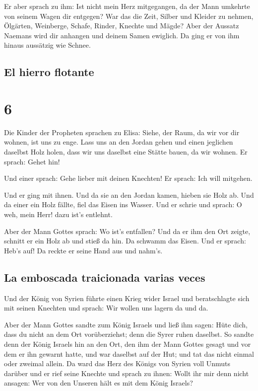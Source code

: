  Er aber sprach zu ihm: Ist nicht mein Herz mitgegangen,
da der Mann umkehrte von seinem Wagen dir entgegen? War das die Zeit,
Silber und Kleider zu nehmen, Ölgärten, Weinberge, Schafe, Rinder,
Knechte und Mägde?  Aber der Aussatz Naemans wird dir
anhangen und deinem Samen ewiglich. Da ging er von ihm hinaus aussätzig
wie Schnee.

\hypertarget{el-hierro-flotante}{%
\subsection{El hierro flotante}\label{el-hierro-flotante}}

\hypertarget{section-5}{%
\section{6}\label{section-5}}

 Die Kinder der Propheten sprachen zu Elisa: Siehe, der
Raum, da wir vor dir wohnen, ist uns zu enge.  Lass uns an
den Jordan gehen und einen jeglichen daselbst Holz holen, dass wir uns
daselbst eine Stätte bauen, da wir wohnen. Er sprach: Gehet hin!

 Und einer sprach: Gehe lieber mit deinen Knechten! Er
sprach: Ich will mitgehen.

 Und er ging mit ihnen. Und da sie an den Jordan kamen,
hieben sie Holz ab.  Und da einer ein Holz fällte, fiel
das Eisen ins Wasser. Und er schrie und sprach: O weh, mein Herr! dazu
ist's entlehnt.

 Aber der Mann Gottes sprach: Wo ist's entfallen? Und da
er ihm den Ort zeigte, schnitt er ein Holz ab und stieß da hin. Da
schwamm das Eisen.  Und er sprach: Heb's auf! Da reckte er
seine Hand aus und nahm's.

\hypertarget{la-emboscada-traicionada-varias-veces}{%
\subsection{La emboscada traicionada varias
veces}\label{la-emboscada-traicionada-varias-veces}}

 Und der König von Syrien führte einen Krieg wider Israel
und beratschlagte sich mit seinen Knechten und sprach: Wir wollen uns
lagern da und da.

 Aber der Mann Gottes sandte zum König Israels und ließ
ihm sagen: Hüte dich, dass du nicht an dem Ort vorüberziehst; denn die
Syrer ruhen daselbst.  So sandte denn der König Israels
hin an den Ort, den ihm der Mann Gottes gesagt und vor dem er ihn
gewarnt hatte, und war daselbst auf der Hut; und tat das nicht einmal
oder zweimal allein.  Da ward das Herz des Königs von
Syrien voll Unmuts darüber und er rief seine Knechte und sprach zu
ihnen: Wollt ihr mir denn nicht ansagen: Wer von den Unseren hält es mit
dem König Israels?

